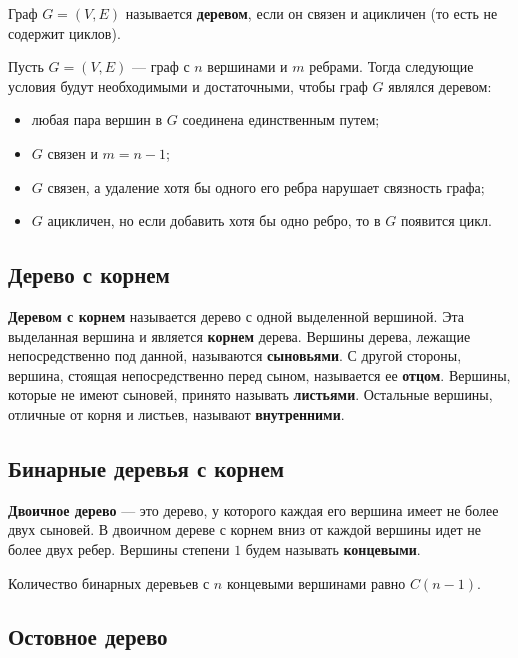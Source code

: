 Граф \(G = (V, E)\) называется \textbf{деревом}, если он связен и ацикличен (то есть не содержит циклов).

Пусть \(G = (V, E)\) --- граф с \(n\) вершинами и \(m\) ребрами. Тогда следующие условия будут необходимыми и достаточными, чтобы граф \(G\) являлся деревом:
\begin{itemize}
    \item любая пара вершин в \(G\) соединена единственным путем;
    \item \(G\) связен и \(m = n - 1\);
    \item \(G\) связен, а удаление хотя бы одного его ребра нарушает связность графа;
    \item \(G\) ацикличен, но если добавить хотя бы одно ребро, то в \(G\) появится цикл.
\end{itemize}

\subsection{Дерево с корнем}

\textbf{Деревом с корнем} называется дерево с одной выделенной вершиной. Эта выделанная вершина и является \textbf{корнем} дерева. Вершины дерева, лежащие непосредственно под данной, называются \textbf{сыновьями}. С другой стороны, вершина, стоящая непосредственно перед сыном, называется ее \textbf{отцом}. Вершины, которые не имеют сыновей, принято называть \textbf{листьями}. Остальные вершины, отличные от корня и листьев, называют \textbf{внутренними}.

\subsection{Бинарные деревья с корнем}

\textbf{Двоичное дерево} --- это дерево, у которого каждая его вершина имеет не более двух сыновей. В двоичном дереве с корнем вниз от каждой вершины идет не более двух ребер. Вершины степени \(1\) будем называть \textbf{концевыми}.

\begin{theorem*}
    Количество бинарных деревьев с \(n\) концевыми вершинами равно \(C(n - 1)\).
\end{theorem*}

\subsection{Остовное дерево}

